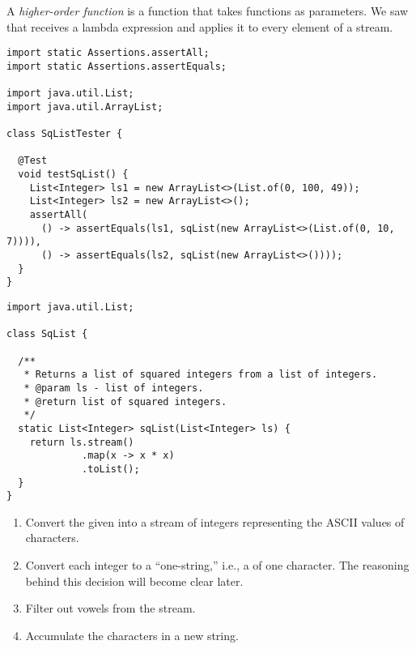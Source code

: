 A \emph{higher-order function} is a function that takes functions as parameters. We saw that  receives a lambda expression and applies it to every element of a stream. 



\begin{lstlisting}[language=MyJava]
import static Assertions.assertAll;
import static Assertions.assertEquals;

import java.util.List;
import java.util.ArrayList;

class SqListTester {

  @Test
  void testSqList() {
    List<Integer> ls1 = new ArrayList<>(List.of(0, 100, 49));
    List<Integer> ls2 = new ArrayList<>();
    assertAll(
      () -> assertEquals(ls1, sqList(new ArrayList<>(List.of(0, 10, 7)))),
      () -> assertEquals(ls2, sqList(new ArrayList<>())));
  }
}
\end{lstlisting}    

\begin{lstlisting}[language=MyJava]
import java.util.List;

class SqList {

  /**
   * Returns a list of squared integers from a list of integers.
   * @param ls - list of integers.
   * @return list of squared integers.
   */
  static List<Integer> sqList(List<Integer> ls) {
    return ls.stream()
             .map(x -> x * x)
             .toList();
  }
}
\end{lstlisting}    


\begin{enumerate}
    \item Convert the given  into a stream of integers representing the ASCII values of characters.
    \item Convert each integer to a ``one-string,'' i.e., a  of one character. The reasoning behind this decision will become clear later.
    \item Filter out vowels from the stream.
    \item Accumulate the characters in a new string.
\end{enumerate}

